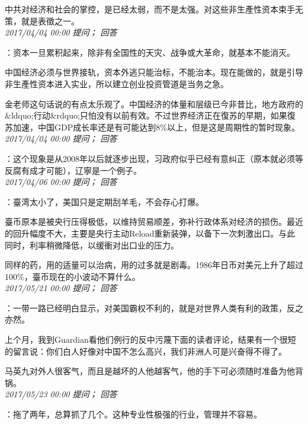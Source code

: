 \documentclass[twocolumn]{ctexart}
\begin{document}
中共对经济和社会的掌控，是已经太弱，而不是太强。对这些非生產性资本束手无策，就是表徵之一。\\

\textit{\hfill\noindent\small 2017/04/04 00:00 提问； 回答}

：资本一旦累积起来，除非有全国性的天灾、战争或大革命，就基本不能消灭。

中国经济必须与世界接轨，资本外逃只能治标，不能治本。现在能做的，就是引导非生產性资本进入实业，所以建立创业投资管道是当务之急。

金老师这句话说的有点太乐观了。中国经济的体量和层级已今非昔比，地方政府的\&ldquo;行动\&rdquo;只怕没有以前有效。不过世界经济正在復苏的早期，如果復苏加速，中国GDP成长率还是有可能达到8\%以上，但是这是周期性的暂时现象。\\

\textit{\hfill\noindent\small 2017/04/04 00:00 提问； 回答}

：这个现象是从2008年以后就逐步出现，习政府似乎已经有意纠正（原本就必须等反腐有成才可能），辽寧是一个例子。\\

\textit{\hfill\noindent\small 2017/04/06 00:00 提问； 回答}

：臺湾太小了，美国只是定期刮羊毛，不会存心打爆。

臺币原本是被央行压得极低，以维持贸易顺差，弥补行政体系对经济的损伤。最近的回升幅度不大，主要是央行主动Reload重新装弹，以备下一次刺激出口。与此同时，利率稍微降低，以缓衝对出口业的压力。

同样的药，用的适量可以治病，用的过多就是剧毒。1986年日币对美元上升了超过100\%，臺币现在的小波动不算什么。\\

\textit{\hfill\noindent\small 2017/05/21 00:00 提问； 回答}

：一带一路已经明白显示，对美国霸权不利的，就是对世界人类有利的政策，反之亦然。

上个月，我到Guardian看他们例行的反中污蔑下面的读者评论，结果有一个很短的留言说：你们白人好像对中国不怎么高兴，我们非洲人可是兴奋得不得了。

马英九对外人很客气，而且是越坏的人他越客气，他的手下可必须随时准备为他背锅。\\

\textit{\hfill\noindent\small 2017/05/23 00:00 提问； 回答}

：拖了两年，总算抓了几个。这种专业性极强的行业，管理并不容易。\\
\end{document}

